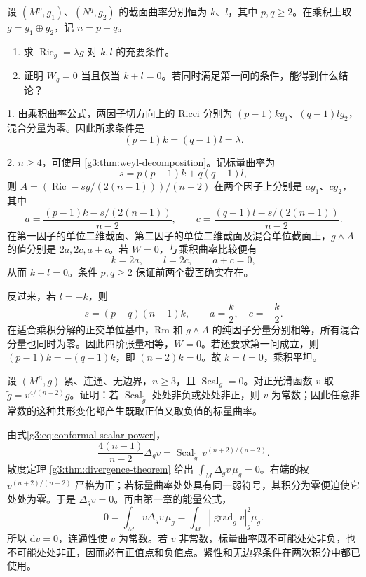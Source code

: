 \begin{exercise}\label{g3:ex:product-weyl-criterion}
	设 \((M^p,g_1)\)、\((N^q,g_2)\) 的截面曲率分别恒为 \(k\)、\(l\)，其中 \(p,q\ge2\)。在乘积上取 \(g=g_1\oplus g_2\)，记 \(n=p+q\)。
	\begin{enumerate}
		\item 求 \(\operatorname{Ric}_g=\lambda g\) 对 \(k,l\) 的充要条件。
		\item 证明 \(W_g=0\) 当且仅当 \(k+l=0\)。若同时满足第一问的条件，能得到什么结论？
	\end{enumerate}
\end{exercise}
\begin{solution}
	1. 由乘积曲率公式，两因子切方向上的 Ricci 分别为 \((p-1)k g_1\)、\((q-1)l g_2\)，混合分量为零。因此所求条件是
	\[
		(p-1)k=(q-1)l=\lambda.
	\]

	2. \(n\ge4\)，可使用 \cref{g3:thm:weyl-decomposition}。记标量曲率为
	\[
		s=p(p-1)k+q(q-1)l,
	\]
	则 \(A=(\operatorname{Ric}-s g/(2(n-1)))/(n-2)\) 在两个因子上分别是 \(a g_1\)、\(c g_2\)，其中
	\[
		a=\frac{(p-1)k-s/(2(n-1))}{n-2},\qquad
		c=\frac{(q-1)l-s/(2(n-1))}{n-2}.
	\]
	在第一因子的单位二维截面、第二因子的单位二维截面及混合单位截面上，\(g\wedge A\) 的值分别是 \(2a,2c,a+c\)。若 \(W=0\)，与乘积曲率比较便有
	\[
		k=2a,\qquad l=2c,\qquad a+c=0,
	\]
	从而 \(k+l=0\)。条件 \(p,q\ge2\) 保证前两个截面确实存在。

	反过来，若 \(l=-k\)，则
	\[
		s=(p-q)(n-1)k,\qquad a=\frac k2,\quad c=-\frac k2.
	\]
	在适合乘积分解的正交单位基中，\(\mathrm{Rm}\) 和 \(g\wedge A\) 的纯因子分量分别相等，所有混合分量也同时为零。因此四阶张量相等，\(W=0\)。若还要求第一问成立，则 \((p-1)k=-(q-1)k\)，即 \((n-2)k=0\)。故 \(k=l=0\)，乘积平坦。
\end{solution}

\begin{exercise}\label{g3:ex:conformal-scalar-sign}
	设 \((M^n,g)\) 紧、连通、无边界，\(n\ge3\)，且 \(\operatorname{Scal}_g=0\)。对正光滑函数 \(v\) 取 \(\widetilde g=v^{4/(n-2)}g\)。证明：若 \(\operatorname{Scal}_{\widetilde g}\) 处处非负或处处非正，则 \(v\) 为常数；因此任意非常数的这种共形变化都产生既取正值又取负值的标量曲率。
\end{exercise}
\begin{solution}
	由式\eqref{g3:eq:conformal-scalar-power}，
	\[
		\frac{4(n-1)}{n-2}\Delta_gv
		=\operatorname{Scal}_{\widetilde g}\,v^{(n+2)/(n-2)}.
	\]
	散度定理 \cref{g3:thm:divergence-theorem} 给出 \(\int_M\Delta_gv\,\mu_g=0\)。右端的权 \(v^{(n+2)/(n-2)}\) 严格为正；若标量曲率处处具有同一弱符号，其积分为零便迫使它处处为零。于是 \(\Delta_gv=0\)。再由第一章的能量公式，
	\[
		0=\int_Mv\Delta_gv\,\mu_g
		=\int_M|\operatorname{grad}_gv|_g^2\mu_g.
	\]
	所以 \(\mathrm dv=0\)，连通性使 \(v\) 为常数。若 \(v\) 非常数，标量曲率既不可能处处非负，也不可能处处非正，因而必有正值点和负值点。紧性和无边界条件在两次积分中都已使用。
\end{solution}

